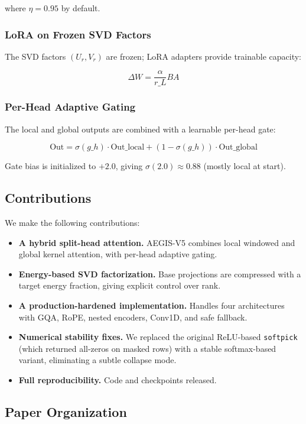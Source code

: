 where $\eta = 0.95$ by default.

\subsubsection{LoRA on Frozen SVD Factors}

The SVD factors $(U_r, V_r)$ are frozen; LoRA adapters provide trainable 
capacity:

\[
\Delta W = \frac{\alpha}{r\_L} B A
\]

\subsubsection{Per-Head Adaptive Gating}

The local and global outputs are combined with a learnable per-head gate:

\[
\text{Out} = \sigma(g\_h) \cdot \text{Out}\_\text{local} + (1 - \sigma(g\_h)) \cdot \text{Out}\_\text{global}
\]

Gate bias is initialized to $+2.0$, giving $\sigma(2.0) \approx 0.88$ 
(mostly local at start).

\subsection{Contributions}

We make the following contributions:

\begin{itemize}
\item \textbf{A hybrid split-head attention.} AEGIS-V5 combines local windowed and
  global kernel attention, with per-head adaptive gating.
\item \textbf{Energy-based SVD factorization.} Base projections are compressed with
  a target energy fraction, giving explicit control over rank.
\item \textbf{A production-hardened implementation.} Handles four architectures with
  GQA, RoPE, nested encoders, Conv1D, and safe fallback.
\item \textbf{Numerical stability fixes.} We replaced the original ReLU-based \texttt{softpick}
  (which returned all-zeros on masked rows) with a stable softmax-based
  variant, eliminating a subtle collapse mode.
\item \textbf{Full reproducibility.} Code and checkpoints released.

\end{itemize}
\subsection{Paper Organization}

